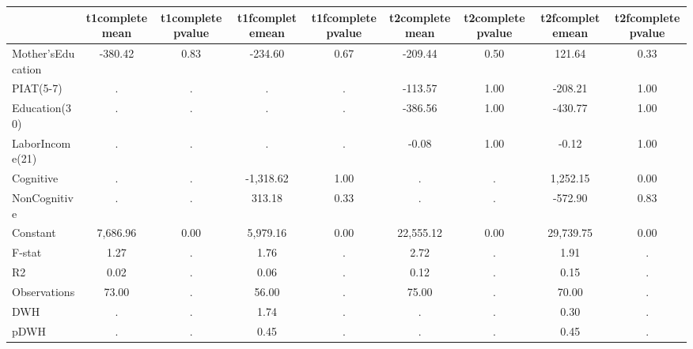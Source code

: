 \begin{table}[htbp]
\begin{tabular}{lcccccccc} \hline \hline
 & t1completemean  & t1completepvalue  & t1fcompletemean  & t1fcompletepvalue  & t2completemean  & t2completepvalue  & t2fcompletemean  & t2fcompletepvalue  \\  \hline 
Mother'sEducation &      -380.42 &         0.83 &      -234.60 &         0.67 &      -209.44 &         0.50 &       121.64 &         0.33 \\  
PIAT(5-7) &            . &            . &            . &            . &      -113.57 &         1.00 &      -208.21 &         1.00 \\  
Education(30) &            . &            . &            . &            . &      -386.56 &         1.00 &      -430.77 &         1.00 \\  
LaborIncome(21) &            . &            . &            . &            . &        -0.08 &         1.00 &        -0.12 &         1.00 \\  
Cognitive &            . &            . &    -1,318.62 &         1.00 &            . &            . &     1,252.15 &         0.00 \\  
NonCognitive &            . &            . &       313.18 &         0.33 &            . &            . &      -572.90 &         0.83 \\  
Constant &     7,686.96 &         0.00 &     5,979.16 &         0.00 &    22,555.12 &         0.00 &    29,739.75 &         0.00 \\  
F-stat &         1.27 &            . &         1.76 &            . &         2.72 &            . &         1.91 &            . \\  
R2 &         0.02 &            . &         0.06 &            . &         0.12 &            . &         0.15 &            . \\  
Observations &        73.00 &            . &        56.00 &            . &        75.00 &            . &        70.00 &            . \\  
DWH &            . &            . &         1.74 &            . &            . &            . &         0.30 &            . \\  
pDWH &            . &            . &         0.45 &            . &            . &            . &         0.45 &            . \\  
\hline \hline \end{tabular}
\end{table}
